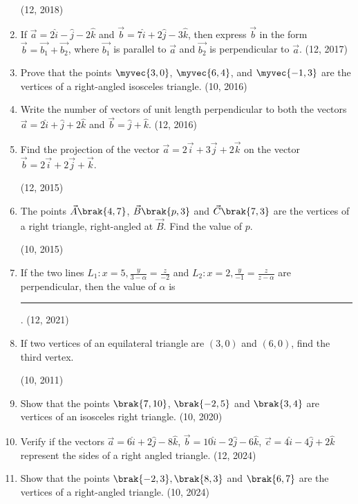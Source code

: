 \begin{enumerate}[label=\thesubsection.\arabic*, ref=\thesubsection.\theenumi]
\hfill (12, 2018) 
    \item If $\vec{a} = 2\hat{i} - \hat{j} - 2\hat{k}$ and $\vec{b} = 7\hat{i} + 2\hat{j} - 3\hat{k}$, then express $\vec{b}$ in the form $\vec{b} = \vec{b_1} + \vec{b_2}$, where $\vec{b_1}$ is parallel to $\vec{a}$ and $\vec{b_2}$ is perpendicular to $\vec{a}$. \hfill (12, 2017)
    \item Prove that the points $\myvec{3,0}$, $\myvec{6,4}$, and $\myvec{-1,3}$ are the vertices of a right-angled isosceles triangle. \hfill (10, 2016)
\item Write the number of vectors of unit length perpendicular to both the vectors
          $\vec{a}  = 2 \hat{i} + \hat{j} +2\hat{k}$  and 
          $\vec{b}  = \hat{j}+\hat{k}$.
\hfill (12, 2016)
\item Find the projection of the vector $\vec{a}=2\overrightarrow{i}+3\overrightarrow{j}+2\overrightarrow{k}$ on the vector $\vec{b}=2\overrightarrow{i}+2\overrightarrow{j}+\overrightarrow{k}$.

	\hfill (12, 2015)
\item The points $\vec{A}\brak{4, 7}$, $\vec{B}\brak{p, 3}$ and $\vec{C}\brak{7, 3}$ are the vertices of a right triangle, right-angled at $\vec{B}$. Find the value of $p$.

	\hfill (10, 2015)
\item If the two lines
     $L_1 : x=5,\frac{y}{3-\alpha}=\frac{z}{-2}$ and
     $L_2 : x=2,\frac{y}{-1}=\frac{z}{z-\alpha}$ 
are perpendicular, then the value of $\alpha$  is \rule{1cm}{0.2pt}.
\hfill (12, 2021)
    \item If two vertices of an equilateral triangle are $(3,0)$ and $(6,0)$, find the third vertex.   

\hfill (10, 2011)
\item Show that the points $\brak{7, 10}$, $\brak{-2, 5}$ and $\brak{3, 4}$ are vertices of an isosceles right triangle.
\hfill (10, 2020)
\item Verify if 
the vectors 
$\overrightarrow{a}=6\hat{i}+2\hat{j}-8\hat{k}$, 
$\overrightarrow{b} = 10\hat{i}-2\hat{j}-6\hat{k}$,  
$\overrightarrow{c} = 4\hat{i}-4\hat{j}+2\hat{k}$  
represent the sides of a right angled triangle.                  
		\hfill (12, 2024)
\item Show that the points $\brak{-2,3}, \brak{8,3}$ and $\brak{6,7} $ are the vertices of a right-angled triangle.
\hfill	(10, 2024)
\end{enumerate}
